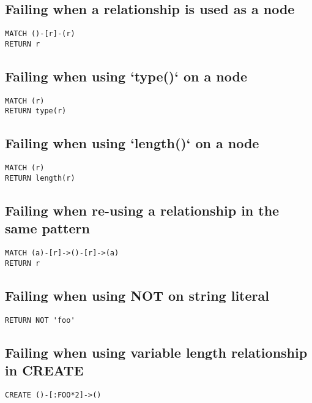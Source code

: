 \subsection{Failing when a relationship is used as a node}

\begin{lstlisting}
MATCH ()-[r]-(r)
RETURN r
\end{lstlisting}

\subsection{Failing when using `type()` on a node}

\begin{lstlisting}
MATCH (r)
RETURN type(r)
\end{lstlisting}

\subsection{Failing when using `length()` on a node}

\begin{lstlisting}
MATCH (r)
RETURN length(r)
\end{lstlisting}

\subsection{Failing when re-using a relationship in the same pattern}

\begin{lstlisting}
MATCH (a)-[r]->()-[r]->(a)
RETURN r
\end{lstlisting}

\subsection{Failing when using NOT on string literal}

\begin{lstlisting}
RETURN NOT 'foo'
\end{lstlisting}

\subsection{Failing when using variable length relationship in CREATE}

\begin{lstlisting}
CREATE ()-[:FOO*2]->()
\end{lstlisting}

